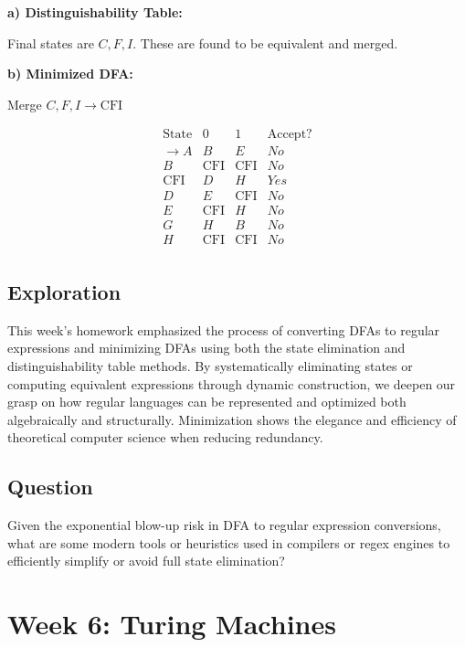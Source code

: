 \documentclass[11pt]{article}
\begin{document}
\begin{itemize}[leftmargin=*]
\textbf{a) Distinguishability Table:}

Final states are \( C, F, I \). These are found to be equivalent and merged.

\textbf{b) Minimized DFA:}

Merge \( C, F, I \to \text{CFI} \)

\[
\begin{array}{c|cc|c}
    \text{State} & 0 & 1 & \text{Accept?} \\
    \hline
    \rightarrow A & B & E & No \\
    B & \text{CFI} & \text{CFI} & No \\
    \text{CFI} & D & H & Yes \\
    D & E & \text{CFI} & No \\
    E & \text{CFI} & H & No \\
    G & H & B & No \\
    H & \text{CFI} & \text{CFI} & No \\
\end{array}
\]

\end{itemize}

\subsection{Exploration}

This week's homework emphasized the process of converting DFAs to regular expressions and minimizing DFAs using both the state elimination and distinguishability table methods. By systematically eliminating states or computing equivalent expressions through dynamic construction, we deepen our grasp on how regular languages can be represented and optimized both algebraically and structurally. Minimization shows the elegance and efficiency of theoretical computer science when reducing redundancy.

\subsection{Question}

Given the exponential blow-up risk in DFA to regular expression conversions, what are some modern tools or heuristics used in compilers or regex engines to efficiently simplify or avoid full state elimination?

\section{Week 6: Turing Machines}
\end{document}
